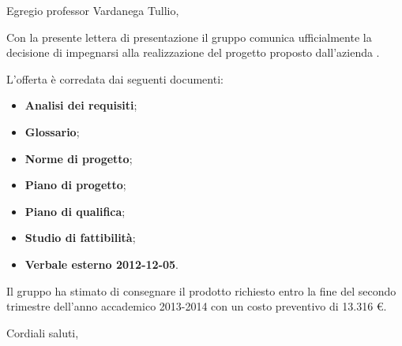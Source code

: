 





Egregio professor Vardanega Tullio,

Con la presente lettera di presentazione il gruppo \GroupName{} comunica ufficialmente la decisione di impegnarsi alla realizzazione del progetto \ProjectName{} proposto dall'azienda \Proponente{}.

L'offerta è corredata dai seguenti documenti:

\begin{itemize}

	\item \textbf{Analisi dei requisiti};
	\item \textbf{Glossario};
	\item \textbf{Norme di progetto};
	\item \textbf{Piano di progetto};
	\item \textbf{Piano di qualifica};
	\item \textbf{Studio di fattibilità};
	\item \textbf{Verbale esterno 2012-12-05}.

\end{itemize}

Il gruppo \GroupName{} ha stimato di consegnare il prodotto richiesto entro la fine del secondo trimestre dell'anno accademico 2013-2014 con un costo preventivo di 13.316 €.

Cordiali saluti,

\textit{\Responsabile{}}

\appendix
%


